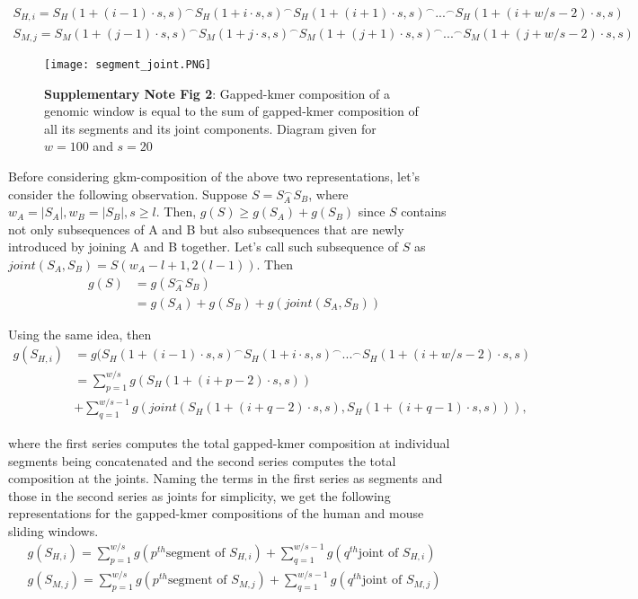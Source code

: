\documentclass[english]{article}
\begin{document}
\begin{align*}
    S_{H,i} = S_H(1+(i-1)\cdot s,s)^\frown S_H(1+i\cdot s,s) ^\frown S_H(1+(i+1)\cdot s,s) ^\frown ... ^\frown S_H(1+(i+w/s-2)\cdot s,s) \\
    S_{M,j} = S_M(1+(j-1)\cdot s,s)^\frown S_M(1+j\cdot s,s) ^\frown S_M(1+(j+1)\cdot s,s) ^\frown ... ^\frown S_M(1+(j+w/s-2)\cdot s,s)
\end{align*}

\begin{figure}[H]
\hspace*{2cm} 
\texttt{[image: segment\_joint.PNG]}
\caption{\textbf{Supplementary Note Fig 2}: Gapped-kmer composition of a genomic window is equal to the sum of gapped-kmer composition of all its segments and its joint components. Diagram given for $w=100$ and $s=20$}
\end{figure}

Before considering gkm-composition of the above two representations, let's consider the following observation. Suppose $S=S_A ^\frown S_B$, where $w_A =|S_A|,w_B=|S_B|,s\geq l$. Then, $g(S) \geq g(S_A) + g(S_B)$ since $S$ contains not only  subsequences of A and B but also subsequences that are newly introduced by joining A and B together. Let's call such subsequence of $S$ as $joint(S_A,S_B)=S(w_A-l+1,2(l-1))$.
Then
\begin{align*}
g(S)&=g(S_A^\frown S_B) \\
      &= g(S_A) + g(S_B) + g(joint(S_A,S_B))
\end{align*}






Using the same idea, then
\begin{align*}
    g(S_{H,i}) &= g(S_H(1+(i-1)\cdot s,s)^\frown S_H(1+ i\cdot s,s) ^\frown ... ^\frown S_H(1+(i+w/s-2)\cdot s,s) \\
    &= \sum_{p=1}^{w/s}g(S_H(1+(i+p-2)\cdot s,s))\\
    &+ \sum_{q=1}^{w/s-1} g(joint(S_H(1+(i+q-2)\cdot s,s), S_H(1+(i+q-1)\cdot s,s))),
\end{align*}

where the first series computes the total gapped-kmer composition at individual segments being concatenated and the second series computes the total composition at the joints. Naming the terms in the first series as segments and those in the second series as joints for simplicity, we get the following representations for the gapped-kmer compositions of the human and mouse sliding windows.  
\begin{align*}
    g(S_{H,i}) =\sum_{p=1}^{w/s}g(p^{th} \text{segment of $S_{H,i}$}) + \sum_{q=1}^{w/s-1}g(q^{th} \text{joint of $S_{H,i}$})  \tag{Eq.3}\\
    g(S_{M,j}) =\sum_{p=1}^{w/s}g(p^{th} \text{segment of $S_{M,j}$}) + \sum_{q=1}^{w/s-1}g(q^{th} \text{joint of $S_{M,j}$})  \tag{Eq.4}\\
\end{align*}
\end{document}
